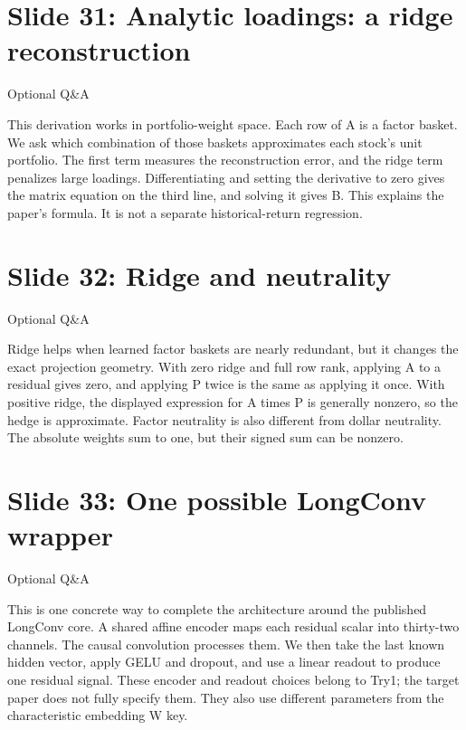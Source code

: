 \documentclass[11pt]{article}
\begin{document}
\section*{Slide 31: Analytic loadings: a ridge reconstruction}

\textcolor{SBred}{Optional Q\&A}

This derivation works in portfolio-weight space. Each row of A is a factor basket. We ask which combination of those baskets approximates each stock's unit portfolio. The first term measures the reconstruction error, and the ridge term penalizes large loadings. Differentiating and setting the derivative to zero gives the matrix equation on the third line, and solving it gives B. This explains the paper's formula. It is not a separate historical-return regression.

\section*{Slide 32: Ridge and neutrality}

\textcolor{SBred}{Optional Q\&A}

Ridge helps when learned factor baskets are nearly redundant, but it changes the exact projection geometry. With zero ridge and full row rank, applying A to a residual gives zero, and applying P twice is the same as applying it once. With positive ridge, the displayed expression for A times P is generally nonzero, so the hedge is approximate. Factor neutrality is also different from dollar neutrality. The absolute weights sum to one, but their signed sum can be nonzero.

\section*{Slide 33: One possible LongConv wrapper}

\textcolor{SBred}{Optional Q\&A}

This is one concrete way to complete the architecture around the published LongConv core. A shared affine encoder maps each residual scalar into thirty-two channels. The causal convolution processes them. We then take the last known hidden vector, apply GELU and dropout, and use a linear readout to produce one residual signal. These encoder and readout choices belong to Try1; the target paper does not fully specify them. They also use different parameters from the characteristic embedding W key.
\end{document}
